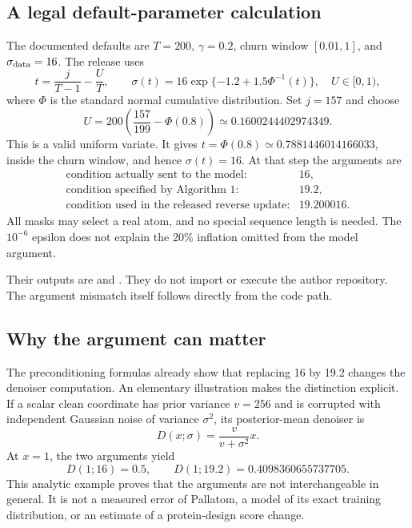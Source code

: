 \documentclass[10pt]{article}
\begin{document}
\subsection*{A legal default-parameter calculation}
The documented defaults are \(T=200\), \(\gamma=0.2\), churn window \([0.01,1]\), and \(\sigma_{\rm data}=16\). The release uses \[t=\frac{j}{T-1}-\frac{U}{T},
\qquad
\sigma(t)=16\exp\{-1.2+1.5\Phi^{-1}(t)\},
\quad U\in[0,1),\] where \(\Phi\) is the standard normal cumulative distribution. Set \(j=157\) and choose \[U=200\left(\frac{157}{199}-\Phi(0.8)\right)
  \simeq0.1600244402974349.\] This is a valid uniform variate. It gives \(t=\Phi(0.8)\simeq0.7881446014166033\), inside the churn window, and hence \(\sigma(t)=16\). At that step the arguments are \[\begin{array}{ll}
\text{condition actually sent to the model:}&16,\\
\text{condition specified by Algorithm 1:}&19.2,\\
\text{condition used in the released reverse update:}&19.200016.
\end{array}\] All masks may select a real atom, and no special sequence length is needed. The \(10^{-6}\) epsilon does not explain the 20\% inflation omitted from the model argument.\par
Their outputs are and . They do not import or execute the author repository. The argument mismatch itself follows directly from the code path.\par
\subsection*{Why the argument can matter}
The preconditioning formulas already show that replacing 16 by 19.2 changes the denoiser computation. An elementary illustration makes the distinction explicit. If a scalar clean coordinate has prior variance \(v=256\) and is corrupted with independent Gaussian noise of variance \(\sigma^2\), its posterior-mean denoiser is \[D(x;\sigma)=\frac{v}{v+\sigma^2}x.\] At \(x=1\), the two arguments yield \[D(1;16)=0.5,\qquad
D(1;19.2)=0.4098360655737705.\] This analytic example proves that the arguments are not interchangeable in general. It is not a measured error of Pallatom, a model of its exact training distribution, or an estimate of a protein-design score change.\par
\end{document}
